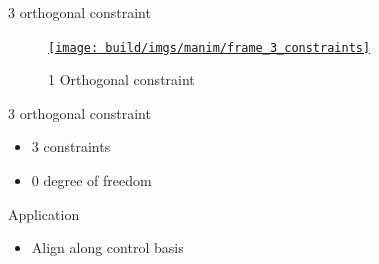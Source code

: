 \documentclass[10pt, xcolor={usenames, dvipsnames}]{beamer}
\begin{document}
        \begin{frame}{3 orthogonal constraint}
            \begin{minipage}{0.33\textwidth}
                \begin{figure}
                    \centering
                    \href{run:frame_3_constraints.mp4?autostart&loop}{\texttt{[image: build/imgs/manim/frame\_3\_constraints]}}
                    \caption{1 Orthogonal constraint}
                \end{figure}
            \end{minipage}
            \hfill
            \begin{minipage}{0.6\textwidth}
                \begin{block}{3 orthogonal constraint}
                    \vspace*{.25cm}
                    \begin{itemize}
                        \item 3 constraints
                        \item 0 degree of freedom
                    \end{itemize}
                \end{block}
                \begin{block}{Application}
                    \begin{itemize}
                        \item Align along control basis
                    \end{itemize}
                \end{block}
            \end{minipage}
        \end{frame}
\end{document}
